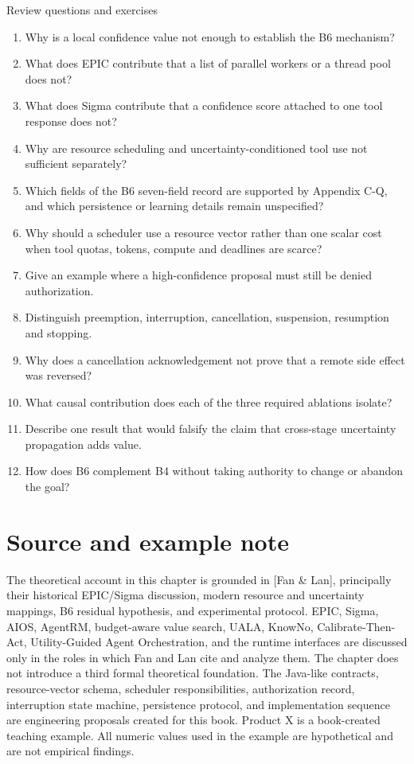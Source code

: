 \begin{reviewquestions}{Review questions and exercises}
\begin{enumerate}
  \item Why is a local confidence value not enough to establish the B6 mechanism?
  \item What does EPIC contribute that a list of parallel workers or a thread pool does not?
  \item What does Sigma contribute that a confidence score attached to one tool response does not?
  \item Why are resource scheduling and uncertainty-conditioned tool use not sufficient separately?
  \item Which fields of the B6 seven-field record are supported by Appendix C-Q, and which persistence or learning details remain unspecified?
  \item Why should a scheduler use a resource vector rather than one scalar cost when tool quotas, tokens, compute and deadlines are scarce?
  \item Give an example where a high-confidence proposal must still be denied authorization.
  \item Distinguish preemption, interruption, cancellation, suspension, resumption and stopping.
  \item Why does a cancellation acknowledgement not prove that a remote side effect was reversed?
  \item What causal contribution does each of the three required ablations isolate?
  \item Describe one result that would falsify the claim that cross-stage uncertainty propagation adds value.
  \item How does B6 complement B4 without taking authority to change or abandon the goal?
\end{enumerate}
\end{reviewquestions}

\section*{Source and example note}

The theoretical account in this chapter is grounded in [Fan \& Lan], principally their historical EPIC/Sigma discussion, modern resource and uncertainty mappings, B6 residual hypothesis, and experimental protocol. EPIC, Sigma, AIOS, AgentRM, budget-aware value search, UALA, KnowNo, Calibrate-Then-Act, Utility-Guided Agent Orchestration, and the runtime interfaces are discussed only in the roles in which Fan and Lan cite and analyze them. The chapter does not introduce a third formal theoretical foundation. The Java-like contracts, resource-vector schema, scheduler responsibilities, authorization record, interruption state machine, persistence protocol, and implementation sequence are engineering proposals created for this book. Product X is a book-created teaching example. All numeric values used in the example are hypothetical and are not empirical findings.


